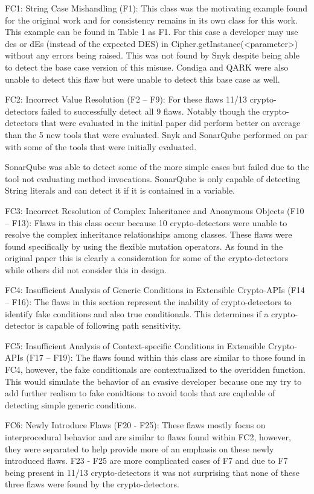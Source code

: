 FC1: String Case Mishandling (F1): This class was the motivating example found for the original work and for consistency remains in its own class for this work. This example can be found in Table 1 as F1. For this case a developer may use des or dEs (instead of the expected DES) in Cipher.getInstance(<parameter>) without any errors being raised. This was not found by Snyk despite being able to detect the base case version of this misuse. Condiga and QARK were also unable to detect this flaw but were unable to detect this base case as well.

FC2: Incorrect Value Resolution (F2 – F9): For these flaws 11/13 crypto-detectors failed to successfully detect all 9 flaws. Notably though the crypto-detectors that were evaluated in the initial paper did perform better on average than the 5 new tools that were evaluated. Snyk and SonarQube performed on par with some of the tools that were initially evaluated. 

SonarQube was able to detect some of the more simple cases but failed due to the tool not evaluating method invocations. SonarQube is only capable of detecting String literals and can detect it if it is contained in a variable. 

FC3: Incorrect Resolution of Complex Inheritance and Anonymous Objects (F10 – F13): Flaws in this class occur because 10 crypto-detectors were unable to resolve the complex inheritance relationships among classes. These flaws were found specifically by using the flexible mutation operators. As found in the original paper this is clearly a consideration for some of the crypto-detectors while others did not consider this in design. 

FC4: Insufficient Analysis of Generic Conditions in Extensible Crypto-APIs (F14 – F16): The flaws in this section represent the inability of crypto-detectors to identify fake conditions and also true conditionals. This determines if a crypto-detector is capable of following path sensitivity.

FC5: Insufficient Analysis of Context-specific Conditions in Extensible Crypto-APIs (F17 – F19): The flaws found within this class are similar to those found in FC4, however, the fake conditionals are contextualized to the overidden function. This would simulate the behavior of an evasive developer because one my try to add further realism to fake conidtions to avoid tools that are capbable of detecting simple generic conditions.

FC6: Newly Introduce Flaws (F20 - F25): These flaws mostly focus on interprocedural behavior and are similar to flaws found within FC2, however, they were separated to help provide more of an emphasis on these newly introduced flaws. F23 - F25 are more complicated cases of F7 and due to F7 being present in 11/13 crypto-detectors it was not surprising that none of these three flaws were found by the crypto-detectors.

